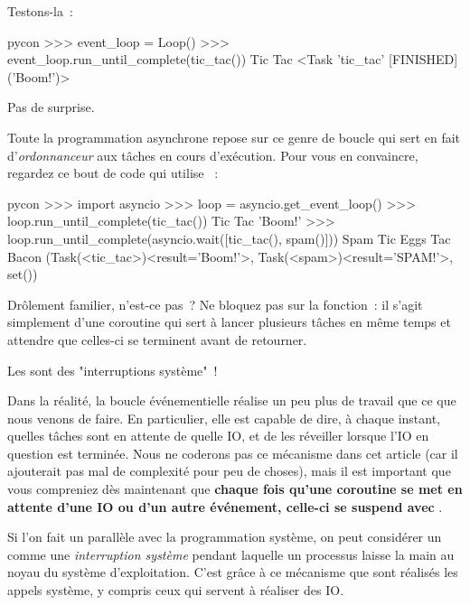 \documentclass[small]{zmdocument}
\begin{document}
Testons-la :



\begin{CodeBlock}{pycon}
>>> event_loop = Loop()
>>> event_loop.run_until_complete(tic_tac())
Tic
Tac
<Task 'tic_tac' [FINISHED] ('Boom!')>
\end{CodeBlock}



Pas de surprise.



Toute la programmation asynchrone repose sur ce genre de boucle qui sert en
fait d'\textit{ordonnanceur} aux tâches en cours d’exécution. Pour vous en convaincre,
regardez ce bout de code qui utilise  :



\begin{CodeBlock}{pycon}
>>> import asyncio
>>> loop = asyncio.get_event_loop()
>>> loop.run_until_complete(tic_tac())
Tic
Tac
'Boom!'
>>> loop.run_until_complete(asyncio.wait([tic_tac(), spam()]))
Spam
Tic
Eggs
Tac
Bacon
({Task(<tic_tac>)<result='Boom!'>, Task(<spam>)<result='SPAM!'>}, set())
\end{CodeBlock}



Drôlement familier, n’est-ce pas ? Ne bloquez pas sur la fonction
 : il s’agit simplement d’une coroutine qui sert à lancer
plusieurs tâches en même temps et attendre que celles-ci se terminent avant de
retourner.



\begin{Information}
Les  sont des "interruptions système" !
\end{Information}


Dans la réalité, la boucle événementielle réalise un peu plus de travail que ce que nous venons de faire.
En particulier, elle est capable de dire, à chaque instant, quelles tâches sont en attente de quelle IO, et de les réveiller lorsque l’IO en question est terminée. Nous ne coderons pas ce mécanisme dans cet article (car il ajouterait pas mal de complexité pour peu de choses), mais il est important que vous compreniez dès maintenant que \textbf{chaque fois qu’une coroutine se met en attente d’une IO ou d’un autre événement, celle-ci se suspend avec }.



Si l’on fait un parallèle avec la programmation système, on peut considérer un  comme une \textit{interruption système} pendant laquelle un processus laisse la main au noyau du système d’exploitation. C’est grâce à ce mécanisme que sont réalisés les appels système, y compris ceux qui servent à réaliser des IO.
\end{document}
